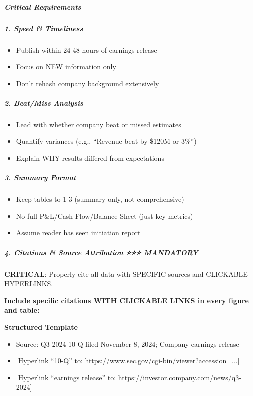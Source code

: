\documentclass[11pt]{article}
\begin{document}
\subparagraph{Critical Requirements}\mbox{}\par

\subparagraph{1. Speed \& Timeliness}\mbox{}\par
\begin{itemize}[leftmargin=*,itemsep=2pt,topsep=2pt]
\item {} Publish within 24-48 hours of earnings release
\item {} Focus on NEW information only
\item {} Don't rehash company background extensively
\end{itemize}

\subparagraph{2. Beat/Miss Analysis}\mbox{}\par
\begin{itemize}[leftmargin=*,itemsep=2pt,topsep=2pt]
\item {} Lead with whether company beat or missed estimates
\item {} Quantify variances (e.g., ``Revenue beat by \$120M or 3\%'')
\item {} Explain WHY results differed from expectations
\end{itemize}

\subparagraph{3. Summary Format}\mbox{}\par
\begin{itemize}[leftmargin=*,itemsep=2pt,topsep=2pt]
\item {} Keep tables to 1-3 (summary only, not comprehensive)
\item {} No full P\&L/Cash Flow/Balance Sheet (just key metrics)
\item {} Assume reader has seen initiation report
\end{itemize}

\subparagraph{4. Citations \& Source Attribution ⭐⭐⭐ MANDATORY}\mbox{}\par

\textbf{CRITICAL}: Properly cite all data with SPECIFIC sources and CLICKABLE HYPERLINKS.


\textbf{Include specific citations WITH CLICKABLE LINKS in every figure and table:}


\textbf{Structured Template}
\begin{itemize}[leftmargin=*,itemsep=2pt,topsep=2pt]
\item {} Source: Q3 2024 10-Q filed November 8, 2024; Company earnings release
\item {} [Hyperlink ``10-Q'' to: https://www.sec.gov/cgi-bin/viewer?accession=...]
\item {} [Hyperlink ``earnings release'' to: https://investor.company.com/news/q3-2024]
\end{itemize}
\end{document}
